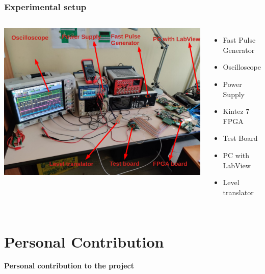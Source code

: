 \documentclass[aspectratio=169]{beamer}
\begin{document}
	\begin{frame}
	\frametitle{Experimental setup}
		\begin{columns}
			\begin{center}
				\includegraphics[width=0.95 \textwidth]{IMG/TestBench.pdf}
			\end{center}
			\begin{itemize}
				\item Fast Pulse Generator
				\item Oscilloscope
				\item Power Supply
				\item Kintez 7 FPGA
				\item Test Board
				\item PC with LabView
				\item Level translator
			\end{itemize}
		\end{columns}
		
	\end{frame}



	\section{Personal Contribution}
	
	\begin{frame}
		\begin{center}
			{\Huge {}\selectfont \color{blue} \textbf{Personal contribution to the project}}
		\end{center}
	\end{frame}
	
\end{document}

